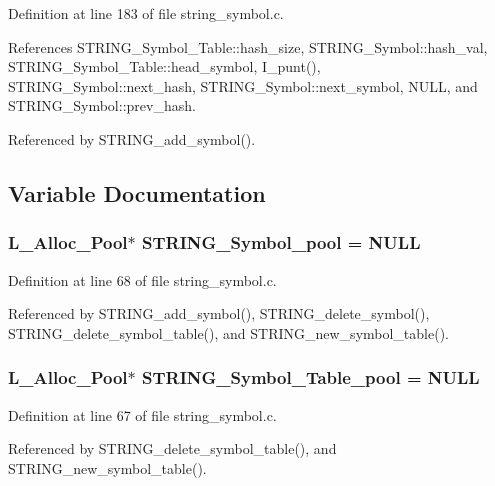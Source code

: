 Definition at line 183 of file string\_\-symbol.c.

References STRING\_\-Symbol\_\-Table::hash\_\-size, STRING\_\-Symbol::hash\_\-val, STRING\_\-Symbol\_\-Table::head\_\-symbol, I\_\-punt(), STRING\_\-Symbol::next\_\-hash, STRING\_\-Symbol::next\_\-symbol, NULL, and STRING\_\-Symbol::prev\_\-hash.

Referenced by STRING\_\-add\_\-symbol().

\subsection{Variable Documentation}
\subsubsection{\setlength{\rightskip}{0pt plus 5cm}\bf{L\_\-Alloc\_\-Pool}$\ast$ \bf{STRING\_\-Symbol\_\-pool} = NULL}\label{string__symbol_8c_dcad894055a6e516d8443484896ddcb8}




Definition at line 68 of file string\_\-symbol.c.

Referenced by STRING\_\-add\_\-symbol(), STRING\_\-delete\_\-symbol(), STRING\_\-delete\_\-symbol\_\-table(), and STRING\_\-new\_\-symbol\_\-table().
\subsubsection{\setlength{\rightskip}{0pt plus 5cm}\bf{L\_\-Alloc\_\-Pool}$\ast$ \bf{STRING\_\-Symbol\_\-Table\_\-pool} = NULL}\label{string__symbol_8c_116e871b4055cf63113a92653cc8f37d}




Definition at line 67 of file string\_\-symbol.c.

Referenced by STRING\_\-delete\_\-symbol\_\-table(), and STRING\_\-new\_\-symbol\_\-table().